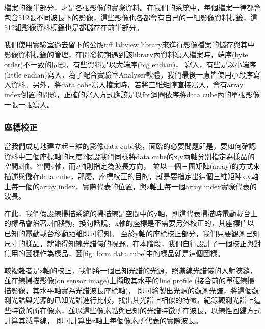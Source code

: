 \documentclass[12pt]{article}
\begin{document}
檔案的後半部分，才是各張影像的實際資料。在我們的系統中，每個檔案一律都會包含512張不同波長下的影像，這些影像也各都會有自己的一組影像資料標籤，這512組影像資料標籤也是都儲存在前半部分。

我們使用實驗室過去留下的公版tiff labview library來進行影像檔案的儲存與其中影像資料標籤的管理，在開發初期遇到該library內資料寫入檔案時，端序(byte order)不一致的問題，有些資料是以大端序(big endian)，
寫入，有些是以小端序(little endian)寫入，為了配合實驗室Analyser軟體，我們最後一慮皆使用小段序寫入資料。另外，將data cobe寫入檔案時，若將三維矩陣直接寫入，會有array index倒置的問題，正確的寫入方式應該是以for迴圈依序將data cube內的單張影像一張一張寫入。

\subsubsection{座標校正}
當我們成功地建立起三維的影像data cube後，面臨的必要問題即是，要如何確認資料中三個座標軸的尺度?假設我們同樣將data cube的x,y兩軸分別指定為樣品的空間x軸、空間y軸，而z軸則指定為波長方向，
並以一個三圍矩陣(array)的方式來描述與儲存data cube，那麼，座標校正的目的，就是要指定出這個三維矩陣x,y軸上每一個的array index，實際代表的位置，與z軸上每一個array index實際代表的波長。

在此，我們假設線掃描系統的掃描線是空間中的y軸，則這代表掃描時電動載台上的樣品會沿著x軸移動，換句話說，x軸的座標是不需要另外校正的，其座標值以已知的電動載台移動距離即可得知。
至於y軸的座標校正部分，我們只要觀測已知尺寸的樣品，就能得知線光譜儀的視野。在本階段，我們自行設計了一個校正與對焦用的圖樣作為樣品，圖\ref{fig: form data cube}中的樣品就是這個圖樣。

較複雜者是z軸的校正，我們將一個已知光譜的光源，照滿線光譜儀的入射狹縫，並在線掃描影像(on sensor image)上擷取其水平的line profile (接合前的單張線掃描影像，其水平軸實為光譜波長座標軸)，
即可繪製出光源的觀測光譜，將這個觀測光譜與光源的已知光譜進行比較，找出其光譜上相似的特徵，紀錄觀測光譜上這些特徵的所在像素，並以這些像素點與已知的光譜特徵所在波長，以線性回歸方式計算其減量線，
即可計算出z軸上每個像素所代表的實際波長。
\end{document}
